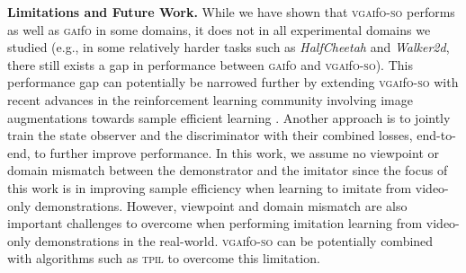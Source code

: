 \documentclass[letterpaper, 10 pt, conference]{ieeeconf}  %
\newcommand{\gaifo}{\textsc{gai}f\textsc{o}}
\newcommand{\vgaifoso}{\textsc{vgai}f\textsc{o}-\textsc{so}}
\begin{document}
\textbf{Limitations and Future Work.} While we have shown that \vgaifoso{} performs as well as \gaifo{} in some domains, it does not in all experimental domains we studied (e.g., in some relatively harder tasks such as \textit{HalfCheetah} and \textit{Walker2d}, there still exists a gap in performance between \gaifo{} and \vgaifoso{}). This performance gap can potentially be narrowed further by extending \vgaifoso{} with recent advances in the reinforcement learning community involving image augmentations towards sample efficient learning \cite{rad, ilyaiclr21}. Another approach is to jointly train the state observer and the discriminator with their combined losses, end-to-end, to further improve performance. In this work, we assume no viewpoint or domain mismatch between the demonstrator and the imitator since the focus of this work is in improving sample efficiency when learning to imitate from video-only demonstrations. However, viewpoint and domain mismatch are also important challenges to overcome when performing imitation learning from video-only demonstrations in the real-world. \vgaifoso{} can be potentially combined with algorithms such as \textsc{tpil} \cite{tpil} to overcome this limitation.

\addtolength{\textheight}{-8cm}   %



\end{document}
